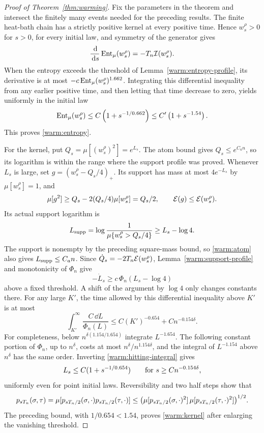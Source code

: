 \begin{proof}[Proof of Theorem~\ref{thm:warming}]
Fix the parameters in the theorem and intersect the finitely many
events needed for the preceding results.  The finite heat-bath chain
has a strictly positive kernel at every positive time.  Hence
\(w_s^\rho>0\) for \(s>0\), for every initial law, and symmetry of
the generator gives
\[
 \frac{\,\mathrm d}{\,\mathrm d s}\operatorname{Ent}_\mu(w_s^\rho)
       =-T_n\mathcal I(w_s^\rho).
\]
When the entropy exceeds the threshold of
Lemma~\ref{warm:entropy-profile}, its derivative is at most
\(-c\operatorname{Ent}_\mu(w_s^\rho)^{1.662}\).  Integrating this differential
inequality from any earlier positive time, and then letting that
time decrease to zero, yields uniformly in the initial law
\[
 \operatorname{Ent}_\mu(w_s^\rho)
       \le C\left(1+s^{-1/0.662}\right)
       \le C'\left(1+s^{-1.54}\right).
\]
This proves \eqref{warm:entropy}.

For the kernel, put \(Q_s=\mu[(w_s^\rho)^2]=e^{L_s}\).
The atom bound gives \(Q_s\le e^{C_an}\), so its logarithm is
within the range where the support profile was proved.
Whenever \(L_s\) is large, set
\(g=(w_s^\rho-Q_s/4)_+\).  Its support has mass at most
\(4e^{-L_s}\) by \(\mu[w_s^\rho]=1\), and
\[
 \mu[g^2]\ge Q_s-2(Q_s/4)\mu[w_s^\rho]=Q_s/2,\qquad
 \mathcal E(g)\le\mathcal E(w_s^\rho).
\]
Its actual support logarithm is
\[
 L_{\rm supp}=\log\frac1{\mu\{w_s^\rho>Q_s/4\}}
       \ge L_s-\log4.
\]
The support is nonempty by the preceding square-mass bound, so
\eqref{warm:atom} also gives \(L_{\rm supp}\le C_an\).
Since \(\dot Q_s=-2T_n\mathcal E(w_s^\rho)\),
Lemma~\ref{warm:support-profile} and monotonicity of \(\Phi_n\) give
\[
 -\dot L_s\ge c\,\Phi_n(L_s-\log4)
\]
above a fixed threshold.  A shift of the argument by \(\log4\)
only changes constants there.  For any large \(K'\), the time
allowed by this differential inequality above \(K'\) is at most
\begin{equation}
 \int_{K'}^\infty\frac{C\,\dd L}{\Phi_n(L)}
       \le C(K')^{-0.654}+C n^{-0.154\delta}.
                                                               \label{warm:hitting-integral}
\end{equation}
For completeness, below
\(n^{\delta(1.154/1.654)}\) integrate \(L^{-1.654}\).
The following constant portion of \(\Phi_n\), up to \(n^\delta\),
costs at most \(n^\delta/n^{1.154\delta}\), and the integral of
\(L^{-1.154}\) above \(n^\delta\) has the same order.
Inverting \eqref{warm:hitting-integral} gives
\[
 L_s\le C(1+s^{-1/0.654})
       \qquad\hbox{for }s\ge Cn^{-0.154\delta},
\]
uniformly even for point initial laws.  Reversibility and two half
steps show that
\[
 p_{sT_n}(\sigma,\tau)
 =\mu[p_{sT_n/2}(\sigma,\cdot)p_{sT_n/2}(\tau,\cdot)]
 \le\bigl(\mu[p_{sT_n/2}(\sigma,\cdot)^2]\,
          \mu[p_{sT_n/2}(\tau,\cdot)^2]\bigr)^{1/2}.
\]
The preceding bound, with \(1/0.654<1.54\), proves
\eqref{warm:kernel} after enlarging the vanishing threshold.


\end{proof}
